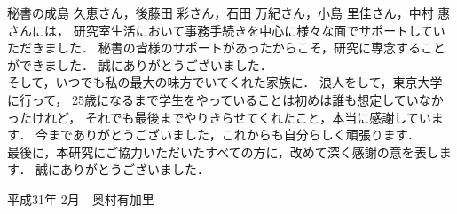 秘書の成島 久恵さん，後藤田 彩さん，石田 万紀さん，小島 里佳さん，中村 惠さんには，
研究室生活において事務手続きを中心に様々な面でサポートしていただきました．
秘書の皆様のサポートがあったからこそ，研究に専念することができました．
誠にありがとうございました．
\\

そして，いつでも私の最大の味方でいてくれた家族に．
浪人をして，東京大学に行って，
25歳になるまで学生をやっていることは初めは誰も想定していなかったけれど，
それでも最後までやりきらせてくれたこと，本当に感謝しています．
今までありがとうございました，これからも自分らしく頑張ります．
\\

最後に，本研究にご協力いただいたすべての方に，改めて深く感謝の意を表します．
誠にありがとうございました．
\\

\begin{flushright}
平成31年 2月　奥村有加里
\end{flushright}


\newpage

